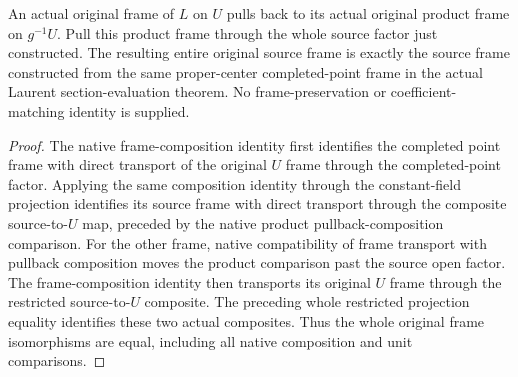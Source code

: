 \begin{theorem}\label{thm:fc-point-laurent-native-local-frame}
\leanok
{}
An actual original frame of $L$ on $U$ pulls back to its actual
original product frame on $g^{-1}U$. Pull this product frame through
the whole source factor just constructed. The resulting entire
original source frame is exactly the source frame constructed from
the same proper-center completed-point frame in the actual
Laurent section-evaluation theorem. No frame-preservation or
coefficient-matching identity is supplied.
\end{theorem}
\begin{proof}
The native frame-composition identity first identifies the completed
point frame with direct transport of the original $U$ frame through
the completed-point factor. Applying the same composition identity
through the constant-field projection identifies its source frame
with direct transport through the composite source-to-$U$ map,
preceded by the native product pullback-composition comparison.
For the other frame, native compatibility of frame transport with
pullback composition moves the product comparison past the source
open factor. The frame-composition identity then transports its
original $U$ frame through the restricted source-to-$U$ composite.
The preceding whole restricted projection equality identifies these
two actual composites. Thus the whole original frame isomorphisms
are equal, including all native composition and unit comparisons.
\end{proof}

